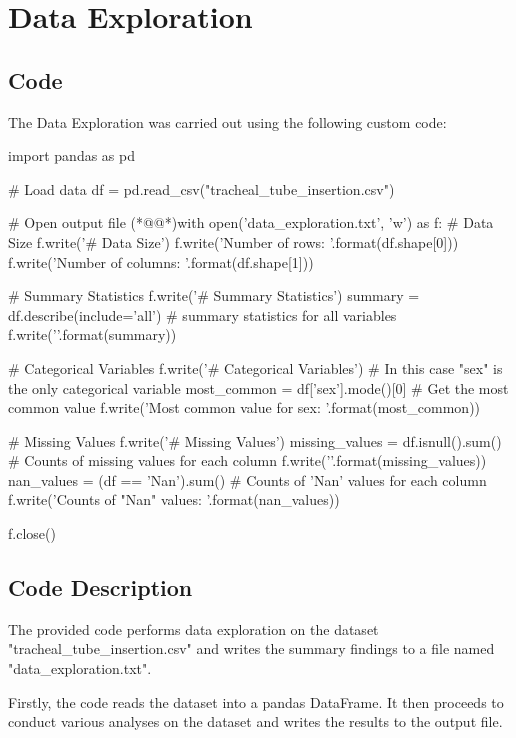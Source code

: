 \documentclass[11pt]{article}
\begin{document}
\section{Data Exploration}
\subsection{{Code}}
The Data Exploration was carried out using the following custom code:

\begin{python}

import pandas as pd

# Load data
df = pd.read_csv("tracheal_tube_insertion.csv")

# Open output file
(*@@*)with open('data_exploration.txt', 'w') as f:
    # Data Size
    f.write('# Data Size\n')
    f.write('Number of rows: {}\n'.format(df.shape[0]))
    f.write('Number of columns: {}\n\n'.format(df.shape[1]))
    
    # Summary Statistics
    f.write('# Summary Statistics\n')
    summary = df.describe(include='all') # summary statistics for all variables
    f.write('{}\n\n'.format(summary))
    
    # Categorical Variables
    f.write('# Categorical Variables\n')
    # In this case "sex" is the only categorical variable
    most_common = df['sex'].mode()[0] # Get the most common value
    f.write('Most common value for sex: {}\n\n'.format(most_common))

    # Missing Values
    f.write('# Missing Values\n')
    missing_values = df.isnull().sum() # Counts of missing values for each column
    f.write('{}\n\n'.format(missing_values))
    nan_values = (df == 'Nan').sum() # Counts of 'Nan' values for each column
    f.write('Counts of "Nan" values: {}\n\n'.format(nan_values))
    
f.close()

\end{python}

\subsection{Code Description}

The provided code performs data exploration on the dataset "tracheal\_tube\_insertion.csv" and writes the summary findings to a file named "data\_exploration.txt".

Firstly, the code reads the dataset into a pandas DataFrame. It then proceeds to conduct various analyses on the dataset and writes the results to the output file.
\end{document}
